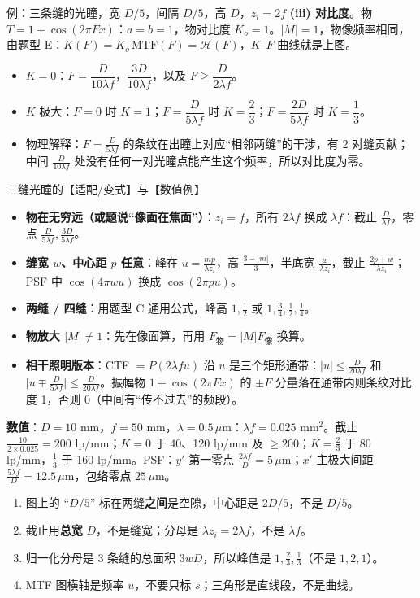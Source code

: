 \begin{exam}{例：三条缝的光瞳，宽 $D/5$，间隔 $D/5$，高 $D$，$z_i=2f$}
\textbf{(iii) 对比度}。物 $T=1+\cos(2\pi Fx)$：$a=b=1$，物对比度 $K_o=1$。$|M|=1$，物像频率相同，由题型 E：$K(F)=K_o\,\mathrm{MTF}(F)=\mathcal H(F)$，$K$–$F$ 曲线就是上图。
\begin{itemize}
\item $K=0$：$F=\dfrac{D}{10\lambda f}$，$\dfrac{3D}{10\lambda f}$，以及 $F\ge\dfrac{D}{2\lambda f}$。
\item $K$ 极大：$F=0$ 时 $K=1$；$F=\dfrac{D}{5\lambda f}$ 时 $K=\dfrac23$；$F=\dfrac{2D}{5\lambda f}$ 时 $K=\dfrac13$。
\item 物理解释：$F=\frac{D}{5\lambda f}$ 的条纹在出瞳上对应“相邻两缝”的干涉，有 2 对缝贡献；中间 $\frac{D}{10\lambda f}$ 处没有任何一对光瞳点能产生这个频率，所以对比度为零。
\end{itemize}
\end{exam}

\begin{exam}{三缝光瞳的【适配/变式】与【数值例】}
\begin{itemize}
\item \textbf{物在无穷远（或题说“像面在焦面”）}：$z_i=f$，所有 $2\lambda f$ 换成 $\lambda f$：截止 $\frac{D}{\lambda f}$，零点 $\frac{D}{5\lambda f},\frac{3D}{5\lambda f}$。
\item \textbf{缝宽 $w$、中心距 $p$ 任意}：峰在 $u=\frac{mp}{\lambda z_i}$，高 $\frac{3-|m|}3$，半底宽 $\frac{w}{\lambda z_i}$，截止 $\frac{2p+w}{\lambda z_i}$；PSF 中 $\cos(4\pi wu)$ 换成 $\cos(2\pi pu)$。
\item \textbf{两缝 / 四缝}：用题型 C 通用公式，峰高 $1,\frac12$ 或 $1,\frac34,\frac12,\frac14$。
\item \textbf{物放大 $|M|\ne1$}：先在像面算，再用 $F_{\text{物}}=|M|F_{\text{像}}$ 换算。
\item \textbf{相干照明版本}：CTF $=P(2\lambda fu)$ 沿 $u$ 是三个矩形通带：$|u|\le\frac{D}{20\lambda f}$ 和 $\big|u\mp\frac{D}{5\lambda f}\big|\le\frac{D}{20\lambda f}$。振幅物 $1+\cos(2\pi Fx)$ 的 $\pm F$ 分量落在通带内则条纹对比度 1，否则 0（中间有“传不过去”的频段）。
\end{itemize}
\textbf{数值}：$D=10$ mm，$f=50$ mm，$\lambda=0.5\,\mu$m：$\lambda f=0.025$ mm$^2$。截止 $\frac{10}{2\times0.025}=200$ lp/mm；$K=0$ 于 40、120 lp/mm 及 $\ge200$；$K=\frac23$ 于 80 lp/mm，$\frac13$ 于 160 lp/mm。PSF：$y'$ 第一零点 $\frac{2\lambda f}{D}=5\,\mu$m；$x'$ 主极大间距 $\frac{5\lambda f}{D}=12.5\,\mu$m，包络零点 $25\,\mu$m。
\end{exam}

\begin{warn}[三缝题易错]
\begin{enumerate}
\item 图上的 “$D/5$” 标在两缝\textbf{之间}是空隙，中心距是 $2D/5$，不是 $D/5$。
\item 截止用\textbf{总宽} $D$，不是缝宽；分母是 $\lambda z_i=2\lambda f$，不是 $\lambda f$。
\item 归一化分母是 3 条缝的总面积 $3wD$，所以峰值是 $1,\frac23,\frac13$（不是 $1,2,1$）。
\item MTF 图横轴是频率 $u$，不要只标 $s$；三角形是直线段，不是曲线。
\end{enumerate}
\end{warn}

